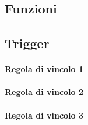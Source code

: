 \subsection{Funzioni} %

\begin{comment}
    operazione 18: calcola il guadagno mensile dato dalla differenza tra la somma delle entrate e la somma delle uscite
    operazione 19: trova il cameriere che effettua più ordini in media al giorno per decidere se promuoverlo o no
\end{comment}

\subsection{Trigger} %
\paragraph{Regola di vincolo 1}
\paragraph{Regola di vincolo 2}
\paragraph{Regola di vincolo 3}


\begin{comment}
    Un dipendente non può svolgere più di 6 turni a settimana.
    Un cliente non può prenotare un tavolo già prenotato.
    Il numero del tavolo deve essere compreso tra 1 e 35.
    La quantità del prodotto non può essere negativa.
\end{comment}

